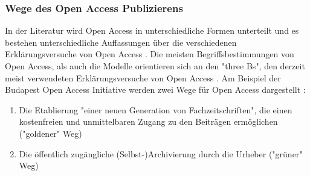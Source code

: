 \subsubsection{Wege des Open Access Publizierens}

In der Literatur wird Open Access in unterschiedliche Formen unterteilt \cite{CREATe_2014} \cite{albert_2006_open_implications} und es bestehen unterschiedliche Auffassungen über die verschiedenen Erklärungsversuche von Open Access \cite{CREATe_2014} \cite{cite:22b} \cite{lewis_2012_inevitability}. Die meisten Begriffsbestimmungen von Open Access, als auch die Modelle orientieren sich an den "three Bs", den derzeit meist verwendeten Erklärungsversuche von Open Access \cite{Adema_2014_open_access}. Am Beispiel der Budapest Open Access Initiative werden zwei Wege für Open Access dargestellt \cite{albert_2006_open_implications}:
\begin{enumerate}
\item Die Etablierung "einer neuen Generation von Fachzeitschriften", die einen kostenfreien und unmittelbaren Zugang zu den Beiträgen ermöglichen ("goldener" Weg)
\item Die öffentlich zugängliche (Selbst-)Archivierung durch die Urheber ("grüner" Weg) \cite{adema_2013_political} \cite{hall_2008_digitize}
\end{enumerate}

